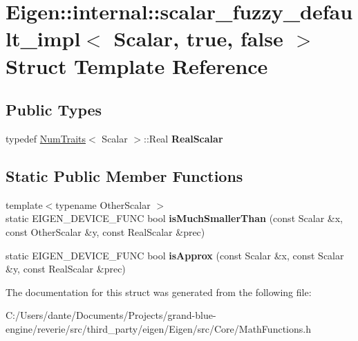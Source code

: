 \hypertarget{struct_eigen_1_1internal_1_1scalar__fuzzy__default__impl_3_01_scalar_00_01true_00_01false_01_4}{}\section{Eigen\+::internal\+::scalar\+\_\+fuzzy\+\_\+default\+\_\+impl$<$ Scalar, true, false $>$ Struct Template Reference}
\label{struct_eigen_1_1internal_1_1scalar__fuzzy__default__impl_3_01_scalar_00_01true_00_01false_01_4}
\subsection*{Public Types}
\begin{DoxyCompactItemize}
\item 
\mbox{\label{struct_eigen_1_1internal_1_1scalar__fuzzy__default__impl_3_01_scalar_00_01true_00_01false_01_4_a7168501255bad24d31ad9d0d9ef78e2c}} 
typedef \mbox{\hyperlink{struct_eigen_1_1_num_traits}{Num\+Traits}}$<$ Scalar $>$\+::Real {\bfseries Real\+Scalar}
\end{DoxyCompactItemize}
\subsection*{Static Public Member Functions}
\begin{DoxyCompactItemize}
\item 
\mbox{\label{struct_eigen_1_1internal_1_1scalar__fuzzy__default__impl_3_01_scalar_00_01true_00_01false_01_4_ad74e406ea92278751ffaeb579b5b7d3e}} 
{\footnotesize template$<$typename Other\+Scalar $>$ }\\static E\+I\+G\+E\+N\+\_\+\+D\+E\+V\+I\+C\+E\+\_\+\+F\+U\+NC bool {\bfseries is\+Much\+Smaller\+Than} (const Scalar \&x, const Other\+Scalar \&y, const Real\+Scalar \&prec)
\item 
\mbox{\label{struct_eigen_1_1internal_1_1scalar__fuzzy__default__impl_3_01_scalar_00_01true_00_01false_01_4_aceaa2d4be54cdd26b2f814612f53c02d}} 
static E\+I\+G\+E\+N\+\_\+\+D\+E\+V\+I\+C\+E\+\_\+\+F\+U\+NC bool {\bfseries is\+Approx} (const Scalar \&x, const Scalar \&y, const Real\+Scalar \&prec)
\end{DoxyCompactItemize}


The documentation for this struct was generated from the following file\+:\begin{DoxyCompactItemize}
\item 
C\+:/\+Users/dante/\+Documents/\+Projects/grand-\/blue-\/engine/reverie/src/third\+\_\+party/eigen/\+Eigen/src/\+Core/Math\+Functions.\+h\end{DoxyCompactItemize}
